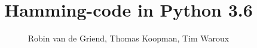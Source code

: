 \documentclass[a4paper]{article}
\begin{document}
\title{Hamming-code in Python 3.6}
\author{Robin van de Griend, Thomas Koopman, Tim Waroux}
\maketitle
\end{document}
